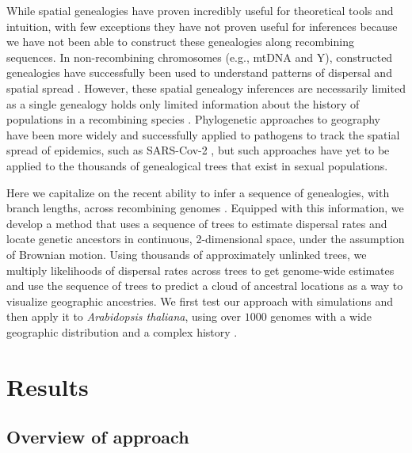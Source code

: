 \documentclass[12pt]{article}
\begin{document}
While spatial genealogies have proven incredibly useful for theoretical tools and intuition, with few exceptions they have not proven useful for inferences because we have not been able to construct these genealogies along recombining sequences.  
In non-recombining chromosomes (e.g., mtDNA and Y), constructed genealogies have successfully been used to understand patterns of dispersal and spatial spread \citep{avise2009phylogeography}.  
However, these spatial genealogy inferences are necessarily limited as a single genealogy holds only limited information about the history of populations in a recombining species \citep{barton1995genealogies}. 
Phylogenetic approaches to geography \citep[`phylogeography';][]{knowles2009statistical} have been more widely and successfully applied to pathogens to track the spatial spread of epidemics, such as SARS-Cov-2 \citep{martin2021insights}, but such approaches have yet to be applied to the thousands of genealogical trees that exist in sexual populations. 

Here we capitalize on the recent ability to infer a sequence of genealogies, with branch lengths, across recombining genomes \citep{rasmussen2014genome,speidel2019method,wohns2021unified}.
Equipped with this information, we develop a method that uses a sequence of trees to estimate dispersal rates and locate genetic ancestors in continuous, 2-dimensional space, under the assumption of Brownian motion.
Using thousands of approximately unlinked trees, we multiply likelihoods of dispersal rates across trees to get genome-wide estimates and use the sequence of trees to predict a cloud of ancestral locations as a way to visualize geographic ancestries.
We first test our approach with simulations and then apply it to \textit{Arabidopsis thaliana}, using over $1000$  genomes with a wide geographic distribution \citep{alonso2016} and a complex history \citep{fulgione2018archaic,hsu2019postglacial}.

\section*{Results}

\subsection*{Overview of approach} 
\end{document}
